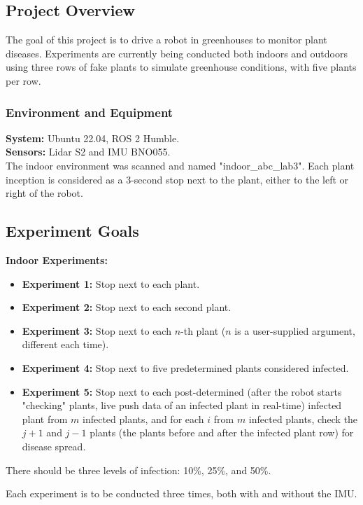 \documentclass[11pt]{article}
\begin{document}
\subsection{Project Overview}

The goal of this project is to drive a robot in greenhouses to monitor plant diseases. Experiments are currently being conducted both indoors and outdoors using three rows of fake plants to simulate greenhouse conditions, with five plants per row.

\subsubsection{Environment and Equipment}
\textbf{System:} Ubuntu 22.04, ROS 2 Humble. \\
\textbf{Sensors:} Lidar S2 and IMU BNO055. \\
The indoor environment was scanned and named "indoor\_abc\_lab3". Each plant inception is considered as a 3-second stop next to the plant, either to the left or right of the robot.

\subsection{Experiment Goals}

\textbf{Indoor Experiments:}
\begin{itemize}
    \item \textbf{Experiment 1:} Stop next to each plant.
    \item \textbf{Experiment 2:} Stop next to each second plant.
    \item \textbf{Experiment 3:} Stop next to each $n$-th plant ($n$ is a user-supplied argument, different each time).
    \item \textbf{Experiment 4:} Stop next to five predetermined plants considered infected.
    \item \textbf{Experiment 5:} Stop next to each post-determined (after the robot starts "checking" plants, live push data of an infected plant in real-time) infected plant from $m$ infected plants, and for each $i$ from $m$ infected plants, check the $j+1$ and $j-1$ plants (the plants before and after the infected plant row) for disease spread.
\end{itemize}

There should be three levels of infection: 10\%, 25\%, and 50\%.

Each experiment is to be conducted three times, both with and without the IMU.
\end{document}
